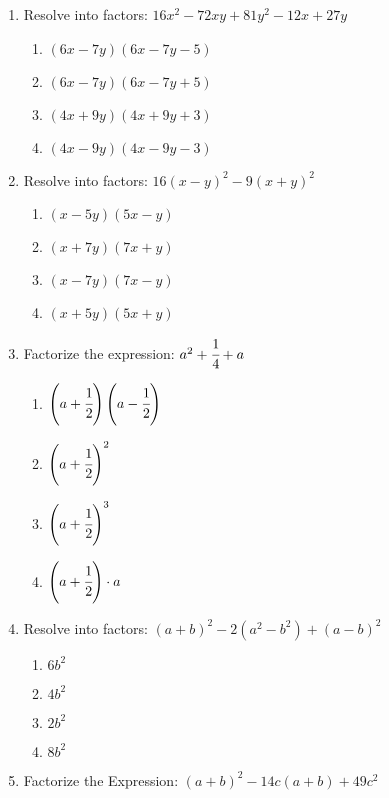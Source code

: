 \begin{multicols}{2}
\begin{enumerate}[label={\arabic*.}]
\begin{enumerate}[label={\Alph*.}]
      \end{enumerate}
    \item Resolve into factors: $16x^2 - 72xy + 81y^2 - 12x + 27y$
      \begin{enumerate}[label={\Alph*.}]
        \item \((6x -7y)(6x - 7y -5)\)
        \item \((6x -7y)(6x - 7y +5)\)
        \item \((4x + 9y)(4x + 9y + 3)\)
        \item \((4x - 9y)(4x - 9y - 3)\)
      \end{enumerate}
    \item Resolve into factors: $16(x-y)^2 - 9(x+y)^2$
      \begin{enumerate}[label={\Alph*.}]
        \item \((x-5y)(5x -y)\)
        \item \((x+7y)(7x + y)\)
        \item \((x-7y)(7x-y)\)
        \item \((x+5y)(5x + y)\)
      \end{enumerate}
    \item Factorize the expression: $a^2 + \cfrac{1}{4} + a$
      \begin{multicols}{2}
        \begin{enumerate}[label={\Alph*.}]
          \item \(\left(a+ \cfrac{1}{2}\right) \left(a - \cfrac{1}{2}\right) \)
          \item \(\left(a+ \cfrac{1}{2}\right)^2\)
          \item \(\left(a+\cfrac{1}{2}\right)^3\)
          \item \(\left(a+ \cfrac{1}{2}\right)\cdot a\)
        \end{enumerate}
      \end{multicols}
    \item Resolve into factors: $(a+b)^2 - 2(a^2 - b^2) + (a-b)^2$
      \begin{enumerate}[label={\Alph*.}]
        \item \(6b^2\)
        \item \(4b^2\)
        \item \(2b^2\)
        \item \(8b^2\)
      \end{enumerate}
    \item Factorize the Expression: $(a+b)^2 - 14c(a+b) + 49c^2$
      \begin{enumerate}[label={\Alph*.}]

\end{enumerate}
\end{enumerate}
\end{multicols}
